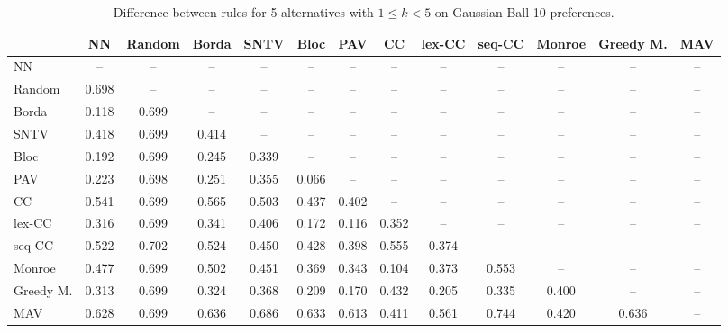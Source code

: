 
\begin{table*}[htbp]
\centering
\begin{tabular}{lcccccccccccc}
\toprule
 & NN & Random & Borda & SNTV & Bloc & PAV & CC & lex-CC & seq-CC & Monroe & Greedy M. & MAV \\
\midrule
NN & -- & -- & -- & -- & -- & -- & -- & -- & -- & -- & -- & -- \\
Random & \cellcolor{blue!69} 0.698 & -- & -- & -- & -- & -- & -- & -- & -- & -- & -- & -- \\
Borda & \cellcolor{blue!11} 0.118 & \cellcolor{blue!69} 0.699 & -- & -- & -- & -- & -- & -- & -- & -- & -- & -- \\
SNTV & \cellcolor{blue!41} 0.418 & \cellcolor{blue!69} 0.699 & \cellcolor{blue!41} 0.414 & -- & -- & -- & -- & -- & -- & -- & -- & -- \\
Bloc & \cellcolor{blue!19} 0.192 & \cellcolor{blue!69} 0.699 & \cellcolor{blue!24} 0.245 & \cellcolor{blue!33} 0.339 & -- & -- & -- & -- & -- & -- & -- & -- \\
PAV & \cellcolor{blue!22} 0.223 & \cellcolor{blue!69} 0.698 & \cellcolor{blue!25} 0.251 & \cellcolor{blue!35} 0.355 & \cellcolor{blue!6} 0.066 & -- & -- & -- & -- & -- & -- & -- \\
CC & \cellcolor{blue!54} 0.541 & \cellcolor{blue!69} 0.699 & \cellcolor{blue!56} 0.565 & \cellcolor{blue!50} 0.503 & \cellcolor{blue!43} 0.437 & \cellcolor{blue!40} 0.402 & -- & -- & -- & -- & -- & -- \\
lex-CC & \cellcolor{blue!31} 0.316 & \cellcolor{blue!69} 0.699 & \cellcolor{blue!34} 0.341 & \cellcolor{blue!40} 0.406 & \cellcolor{blue!17} 0.172 & \cellcolor{blue!11} 0.116 & \cellcolor{blue!35} 0.352 & -- & -- & -- & -- & -- \\
seq-CC & \cellcolor{blue!52} 0.522 & \cellcolor{blue!70} 0.702 & \cellcolor{blue!52} 0.524 & \cellcolor{blue!45} 0.450 & \cellcolor{blue!42} 0.428 & \cellcolor{blue!39} 0.398 & \cellcolor{blue!55} 0.555 & \cellcolor{blue!37} 0.374 & -- & -- & -- & -- \\
Monroe & \cellcolor{blue!47} 0.477 & \cellcolor{blue!69} 0.699 & \cellcolor{blue!50} 0.502 & \cellcolor{blue!45} 0.451 & \cellcolor{blue!36} 0.369 & \cellcolor{blue!34} 0.343 & \cellcolor{blue!10} 0.104 & \cellcolor{blue!37} 0.373 & \cellcolor{blue!55} 0.553 & -- & -- & -- \\
Greedy M. & \cellcolor{blue!31} 0.313 & \cellcolor{blue!69} 0.699 & \cellcolor{blue!32} 0.324 & \cellcolor{blue!36} 0.368 & \cellcolor{blue!20} 0.209 & \cellcolor{blue!17} 0.170 & \cellcolor{blue!43} 0.432 & \cellcolor{blue!20} 0.205 & \cellcolor{blue!33} 0.335 & \cellcolor{blue!40} 0.400 & -- & -- \\
MAV & \cellcolor{blue!62} 0.628 & \cellcolor{blue!69} 0.699 & \cellcolor{blue!63} 0.636 & \cellcolor{blue!68} 0.686 & \cellcolor{blue!63} 0.633 & \cellcolor{blue!61} 0.613 & \cellcolor{blue!41} 0.411 & \cellcolor{blue!56} 0.561 & \cellcolor{blue!74} 0.744 & \cellcolor{blue!42} 0.420 & \cellcolor{blue!63} 0.636 & -- \\
\bottomrule
\end{tabular}

\caption{Difference between rules for 5 alternatives with $1 \leq k < 5$ on Gaussian Ball 10 preferences.}
\label{tab:rule_distance_heatmap-m=[5]-pref_dist=euclidean__args__dimensions=10_-_space=gaussian_ball}
\end{table*}
    